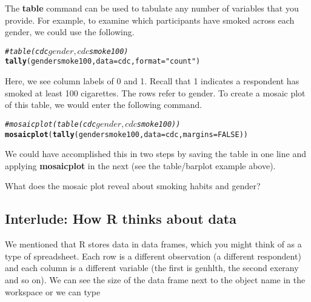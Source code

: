 \documentclass{article}\usepackage[]{graphicx}\usepackage[]{color}
\makeatletter
\newcommand{\hlnum}[1]{\textcolor[rgb]{0.686,0.059,0.569}{#1}}%
\newcommand{\hlstr}[1]{\textcolor[rgb]{0.192,0.494,0.8}{#1}}%
\newcommand{\hlcom}[1]{\textcolor[rgb]{0.678,0.584,0.686}{\textit{#1}}}%
\newcommand{\hlopt}[1]{\textcolor[rgb]{0,0,0}{#1}}%
\newcommand{\hlstd}[1]{\textcolor[rgb]{0.345,0.345,0.345}{#1}}%
\newcommand{\hlkwc}[1]{\textcolor[rgb]{0.333,0.667,0.333}{#1}}%
\newcommand{\hlkwd}[1]{\textcolor[rgb]{0.737,0.353,0.396}{\textbf{#1}}}%
\newenvironment{kframe}{%
 \def\at@end@of@kframe{}%
 \ifinner\ifhmode%
  \def\at@end@of@kframe{\end{minipage}}%
  \begin{minipage}{\columnwidth}%
 \fi\fi%
 \def\FrameCommand##1{\hskip\@totalleftmargin \hskip-\fboxsep
 \colorbox{shadecolor}{##1}\hskip-\fboxsep
     \hskip-\linewidth \hskip-\@totalleftmargin \hskip\columnwidth}%
 \MakeFramed {\advance\hsize-\width
   \@totalleftmargin\z@ \linewidth\hsize
   \@setminipage}}%
 {\par\unskip\endMakeFramed%
 \at@end@of@kframe}
\newenvironment{knitrout}{}{} %
\makeatother
\begin{document}
The \hlkwd{table} command can be used to tabulate any number of variables that you provide.  For example, to examine which participants have smoked across each gender, we could use the following.

\begin{knitrout}
\color{fgcolor}\begin{kframe}
\begin{alltt}
\hlcom{# table(cdc$gender,cdc$smoke100)}
\hlkwd{tally}\hlstd{(gender} \hlopt{\mytilde} \hlstd{smoke100,} \hlkwc{data} \hlstd{= cdc,} \hlkwc{format} \hlstd{=} \hlstr{"count"}\hlstd{)}
\end{alltt}
\end{kframe}
\end{knitrout}


Here, we see column labels of 0 and 1. Recall that 1 indicates a respondent has smoked at least 100 cigarettes. The rows refer to gender. To create a mosaic plot of this table, we would enter the following command.

\begin{knitrout}
\color{fgcolor}\begin{kframe}
\begin{alltt}
\hlcom{# mosaicplot(table(cdc$gender,cdc$smoke100))}
\hlkwd{mosaicplot}\hlstd{(}\hlkwd{tally}\hlstd{(gender} \hlopt{\mytilde} \hlstd{smoke100,} \hlkwc{data} \hlstd{= cdc,} \hlkwc{margins} \hlstd{=} \hlnum{FALSE}\hlstd{))}
\end{alltt}
\end{kframe}
\end{knitrout}


We could have accomplished this in two steps by saving the table in one line and applying \hlkwd{mosaicplot} in the next (see the table/barplot example above).

\begin{exercise}
What does the mosaic plot reveal about smoking habits and gender?
\end{exercise}

\subsection*{Interlude: How R thinks about data}
We mentioned that R stores data in data frames, which you might think of as a type of spreadsheet. Each row is a different observation (a different respondent) and each column is a different variable (the first is \hlstd{genhlth}, the second \hlstd{exerany} and so on). We can see the size of the data frame next to the object name in the workspace or we can type
\end{document}
